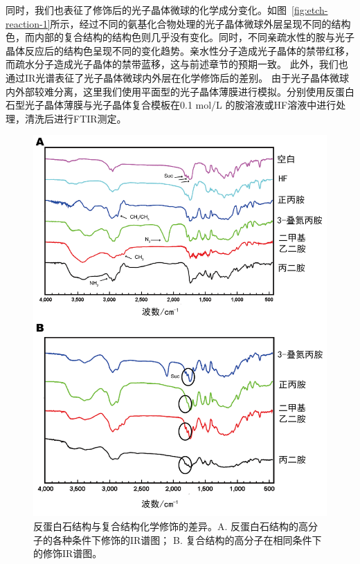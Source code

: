 同时，我们也表征了修饰后的光子晶体微球的化学成分变化。如图~\ref{fig:etch-reaction-1}所示，经过不同的氨基化合物处理的光子晶体微球外层呈现不同的结构色，而内部的复合结构的结构色则几乎没有变化。同时，不同亲疏水性的胺与光子晶体反应后的结构色呈现不同的变化趋势。亲水性分子造成光子晶体的禁带红移，而疏水分子造成光子晶体的禁带蓝移，这与前述章节的预期一致。
此外，我们也通过IR光谱表征了光子晶体微球内外层在化学修饰后的差别。
由于光子晶体微球内外部较难分离，这里我们使用平面型的光子晶体薄膜进行模拟。分别使用反蛋白石型光子晶体薄膜与光子晶体复合模板在0.1 mol/L 的胺溶液或HF溶液中进行处理，清洗后进行FTIR测定。

\begin{figure}[htbp]
  \centering
  \includegraphics[width=0.85\linewidth]{figures/ch5/IR-diff.png}
  \caption{反蛋白石结构与复合结构化学修饰的差异。A. 反蛋白石结构的高分子的各种条件下修饰的IR谱图； B. 复合结构的高分子在相同条件下的修饰IR谱图。}
  \label{fig:IR-diff}
\end{figure}

